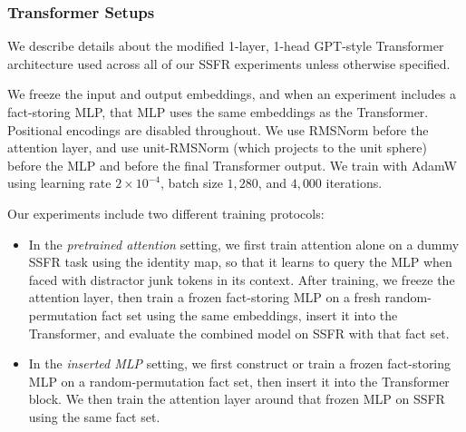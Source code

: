 \subsubsection{Transformer Setups}
\label{app:exp:transformer-setups}
\label{app:ssfr-training-setup}
We describe details about the modified 1-layer, 1-head GPT-style Transformer architecture used across all of our SSFR experiments unless otherwise specified.

We freeze the input and output embeddings, and when an experiment includes a fact-storing MLP, that MLP uses the same embeddings as the Transformer.
Positional encodings are disabled throughout.
We use RMSNorm before the attention layer, and use unit-RMSNorm (which projects to the unit sphere) before the MLP and before the final Transformer output.
We train with AdamW using learning rate $2\times 10^{-4}$, batch size $1{,}280$, and $4{,}000$ iterations.

Our experiments include two different training protocols:
\begin{itemize}
    \item In the \emph{pretrained attention} setting, we first train attention alone on a dummy SSFR task using the identity map, so that it learns to query the MLP when faced with distractor junk tokens in its context.
    After training, we freeze the attention layer, then train a frozen fact-storing MLP on a fresh random-permutation fact set using the same embeddings, insert it into the Transformer, and evaluate the combined model on SSFR with that fact set.
    \item In the \emph{inserted MLP} setting, we first construct or train a frozen fact-storing MLP on a random-permutation fact set, then insert it into the Transformer block. We then train the attention layer around that frozen MLP on SSFR using the same fact set.
\end{itemize}
